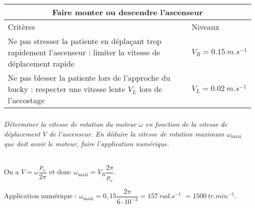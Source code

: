 \begin{multicols}{2}
\begin{center}
\begin{tabular}{|p{.6\linewidth}|p{.3\linewidth}|}
\hline
\multicolumn{2}{|c|}{Faire monter ou descendre l'ascenseur} \\
\hline
Critères & Niveaux \\
\hline
Ne pas stresser la patiente en déplaçant trop rapidement l’ascenseur : limiter la vitesse de
déplacement rapide & $V_R=\SI{0,15}{m.s^{-1}}$ \\ \hline
Ne pas blesser la patiente lors de l’approche du bucky : respecter une vitesse lente $V_L$ lors de
l’accostage & $V_L=\SI{0,02}{m.s^{-1}}$ \\ 
\hline
\end{tabular}
\end{center}


\begin{center}
\end{center}

\subparagraph{}\textit{Déterminer la vitesse de rotation du moteur $\omega$ en fonction de la vitesse de
déplacement $V$ de l’ascenseur. %
En déduire la vitesse de rotation maximum $\omega_{\text{maxi}}$ que doit avoir le moteur, faire l’application numérique.}
\ifprof
\begin{corrige}~\\
On a $V=\omega \dfrac{p_v}{2\pi}$ et donc $\omega_{\text{maxi}} = V_R\dfrac{2\pi}{p_v}$.

Application numérique : $\omega_{\text{maxi}} = 0,15\dfrac{2\pi}{6\cdot 10^{-3}}=\SI{157}{rad.s^{-1}}$ $=\SI{1500}{tr.min^{-1}}$.
\end{corrige}
\else
\fi


\subparagraph{}\textit{}
\ifprof
\begin{corrige}~\\
\end{corrige}
\else
\fi



%
%
%
%


\end{multicols}
